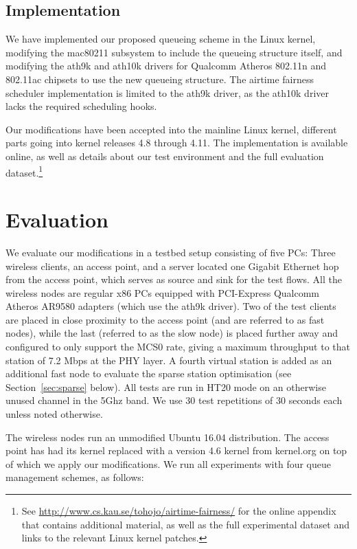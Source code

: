 \documentclass[english]{scrartcl}
\begin{document}
\subsection{Implementation}
\label{sec:org02727bc}
We have implemented our proposed queueing scheme in the Linux kernel, modifying
the mac80211 subsystem to include the queueing structure itself, and modifying
the ath9k and ath10k drivers for Qualcomm Atheros 802.11n and 802.11ac chipsets
to use the new queueing structure. The airtime fairness scheduler implementation
is limited to the ath9k driver, as the ath10k driver lacks the required
scheduling hooks.

Our modifications have been accepted into the mainline Linux kernel, different
parts going into kernel releases 4.8 through 4.11. The implementation is
available online, as well as details about our test environment and the full
evaluation dataset.\footnote{See \url{http://www.cs.kau.se/tohojo/airtime-fairness/} for the online appendix
that contains additional material, as well as the full experimental dataset and
links to the relevant Linux kernel patches.}
\section{Evaluation}
\label{sec:evaluation}
We evaluate our modifications in a testbed setup consisting of five PCs: Three
wireless clients, an access point, and a server located one Gigabit Ethernet hop
from the access point, which serves as source and sink for the test flows. All
the wireless nodes are regular x86 PCs equipped with PCI-Express Qualcomm
Atheros AR9580 adapters (which use the ath9k driver). Two of the test clients
are placed in close proximity to the access point (and are referred to as fast
nodes), while the last (referred to as the slow node) is placed further away and
configured to only support the MCS0 rate, giving a maximum throughput to that
station of 7.2 Mbps at the PHY layer. A fourth virtual station is added as an
additional fast node to evaluate the sparse station optimisation (see
Section \ref{sec:sparse} below). All tests are run in HT20 mode on an otherwise
unused channel in the 5Ghz band. We use 30 test repetitions of 30 seconds each
unless noted otherwise.

The wireless nodes run an unmodified Ubuntu 16.04 distribution. The access point
has had its kernel replaced with a version 4.6 kernel from kernel.org on top of
which we apply our modifications. We run all experiments with four queue
management schemes, as follows:
\end{document}
